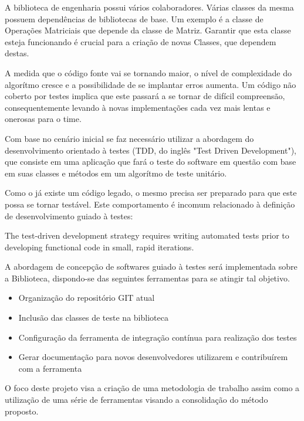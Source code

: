 \documentclass[
	article,			%
	12pt,				%
	oneside,			%
	a4paper,			%
	english,			
	brazil,
	sumario=tradicional
	]{abntex2}
\begin{document}
A biblioteca de engenharia possui vários colaboradores. Várias classes da mesma possuem dependências de bibliotecas de base. Um exemplo é a classe de Operações Matriciais que depende da classe de Matriz. Garantir que esta classe esteja funcionando é crucial para a criação de novas Classes, que dependem destas.

A medida que o código fonte vai se tornando maior, o nível de complexidade do algorítmo cresce e a possibilidade de se implantar erros aumenta. Um código não coberto por testes implica que este passará a se tornar de difícil compreensão, consequentemente levando à novas implementações cada vez mais lentas e onerosas para o time.

Com base no cenário inicial se faz necessário utilizar a abordagem do desenvolvimento orientado à testes (TDD, do inglês "Test Driven Development"), que consiste em uma aplicação que fará o teste do software em questão com base em suas classes e métodos em um algorítmo de teste unitário.

Como o já existe um código legado, o mesmo precisa ser preparado para que este possa se tornar testável. Este comportamento é incomum relacionado à definição de desenvolvimento guiado à testes:

\begin{citacao}
The test-driven development strategy 
requires writing automated tests prior to 
developing functional code in small, rapid 
iterations.
	\cite[Introduction]{testdrivendevelopment.1}
\end{citacao}

A abordagem de concepção de softwares guiado à testes será implementada sobre a Biblioteca, dispondo-se das seguintes ferramentas para se atingir tal objetivo.

\begin{itemize}
	\item{Organização do repositório GIT atual}
	\item{Inclusão das classes de teste na biblioteca}
	\item{Configuração da ferramenta de integração contínua para realização dos testes}
	\item{Gerar documentação para novos desenvolvedores utilizarem e contribuírem com a ferramenta}
\end{itemize}

O foco deste projeto visa a criação de uma metodologia de trabalho assim como a utilização de uma série de ferramentas visando a consolidação do método proposto.
\end{document}
